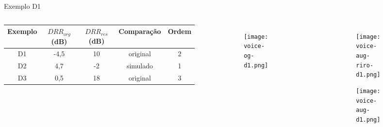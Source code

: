 \begin{frame}{Exemplo D1}
    \begin{columns}

        \begin{table} [H]
            \begin{adjustbox}{width=\columnwidth,center}
                \begin{tabular}{c|c|c|c|c}
            
                    \textbf{Exemplo} & 
                    \textbf{$DRR_{org}$ (dB)} & 
                    \textbf{$DRR_{res}$ (dB)} & 
                    \textbf{Comparação} &
                    \textbf{Ordem} \\
                    \hline 
            
                    D1 & -4,5 & 10 & original & 2 \\
                    D2 & 4,7 & -2 & simulado & 1 \\
                    D3 & 0,5 & 18 & original & 3 \\
            
                \end{tabular}
            \end{adjustbox}
        \end{table}

        \begin{figure}
            \begin{subfigure}{\textwidth}
                \centering
                \texttt{[image: voice-og-d1.png]}
            \end{subfigure}
        \end{figure}

        \begin{figure}
            \begin{subfigure}{\textwidth}
                \centering
                \texttt{[image: voice-aug-riro-d1.png]}
            \end{subfigure}
            \begin{subfigure}{\textwidth}
                \centering
                \texttt{[image: voice-aug-d1.png]}
            \end{subfigure}
        \end{figure}
    \end{columns}
\end{frame}

